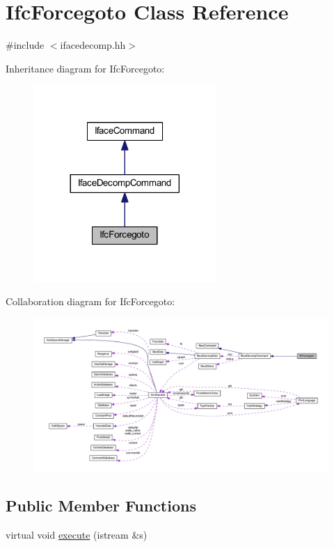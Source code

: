 \hypertarget{class_ifc_forcegoto}{}\section{Ifc\+Forcegoto Class Reference}
\label{class_ifc_forcegoto}


{\ttfamily \#include $<$ifacedecomp.\+hh$>$}



Inheritance diagram for Ifc\+Forcegoto\+:
\nopagebreak
\begin{figure}[H]
\begin{center}
\leavevmode
\includegraphics[width=197pt]{class_ifc_forcegoto__inherit__graph}
\end{center}
\end{figure}


Collaboration diagram for Ifc\+Forcegoto\+:
\nopagebreak
\begin{figure}[H]
\begin{center}
\leavevmode
\includegraphics[width=350pt]{class_ifc_forcegoto__coll__graph}
\end{center}
\end{figure}
\subsection*{Public Member Functions}
\begin{DoxyCompactItemize}
\item 
virtual void \mbox{\hyperlink{class_ifc_forcegoto_a5241453f234330ace35c00d319acd944}{execute}} (istream \&s)
\end{DoxyCompactItemize}
